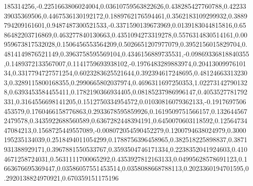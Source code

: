 185314256,-0.2251663806024004,0.03610759563822626,0.438285427760788,0.4223339035369506,0.4467536130192172,0.1889762176594461,0.3562183109299932,0.3889794209161601,0.9487487300521533,-0.3371590139673969,0.0139183044815816,0.6586482203716869,0.463277840130663,0.4351094273319278,0.5576314830514161,0.00959673817532028,0.1506456553564209,0.5026651207977079,0.3952156015829704,0.4814149876521149,0.3963758595569104,0.4346156889735531,-0.09869336818840355,0.1489372133567007,0.1141759693938102,-0.1976483289883974,0.2041300997610134,0.3317794727571254,0.6023283625521644,0.392394617248695,0.481246633132303,0.3289115800168355,0.2990665802037974,0.4696311697250353,1.022731427901328,0.6393453584455411,0.1782190366934405,0.08185237986996147,0.4053527781792331,0.3164556698141205,0.1512750334954572,0.01030816079362133,-0.1917697506453579,0.1760466158776863,0.2933678595859926,0.1619509751566157,0.1326445672479578,0.3435922688560589,0.6367282448394191,0.6450070603118592,0.1256473447084213,0.1568725449557089,-0.008072054590452279,0.1200794638024979,0.3000195235134039,0.2518494011054299,0.1788756396458965,0.382518225898837,0.3871931388929171,0.3967881550533767,0.3593504746171334,0.2238352041924603,0.4104671258724031,0.5631111700065292,0.4353927812163133,0.04995628578691123,0.1663676695369447,0.03586057551453514,0.0358088668788113,0.2023360194701595,0.2920138824970921,0.670359151175196
